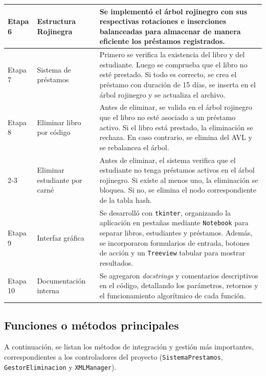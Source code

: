 \documentclass[11pt]{article}
\begin{document}
\begin{longtable}{p{} p{} p{}}
Etapa 6
& Estructura Rojinegra & Se implementó el árbol rojinegro con sus respectivas rotaciones e inserciones balanceadas para almacenar de manera eficiente los préstamos registrados. \\
\midrule

Etapa 7
& Sistema de préstamos & Primero se verifica la existencia del libro y del estudiante. Luego se comprueba que el libro no esté prestado. Si todo es correcto, se crea el préstamo con duración de 15 días, se inserta en el árbol rojinegro y se actualiza el archivo. \\
\midrule

Etapa 8
& Eliminar libro por código & Antes de eliminar, se valida en el árbol rojinegro que el libro no esté asociado a un préstamo activo. Si el libro está prestado, la eliminación se rechaza. En caso contrario, se elimina del AVL y se rebalancea el árbol. \\
\cmidrule{2-3}
& Eliminar estudiante por carné & Antes de eliminar, el sistema verifica que el estudiante no tenga préstamos activos en el árbol rojinegro. Si existe al menos uno, la eliminación se bloquea. Si no, se elimina el nodo correspondiente de la tabla hash. \\
\midrule

Etapa 9
& Interfaz gráfica & Se desarrolló con \texttt{tkinter}, organizando la aplicación en pestañas mediante \texttt{Notebook} para separar libros, estudiantes y préstamos. Además, se incorporaron formularios de entrada, botones de acción y un \texttt{Treeview} tabular para mostrar resultados. \\
\midrule

Etapa 10
& Documentación interna & Se agregaron \textit{docstrings} y comentarios descriptivos en el código, detallando los parámetros, retornos y el funcionamiento algorítmico de cada función. \\
\bottomrule
\end{longtable}

\subsection{Funciones o métodos principales}

A continuación, se listan los métodos de integración y gestión más importantes, correspondientes a los controladores del proyecto (\texttt{SistemaPrestamos}, \texttt{GestorEliminacion} y \texttt{XMLManager}).
\end{document}
